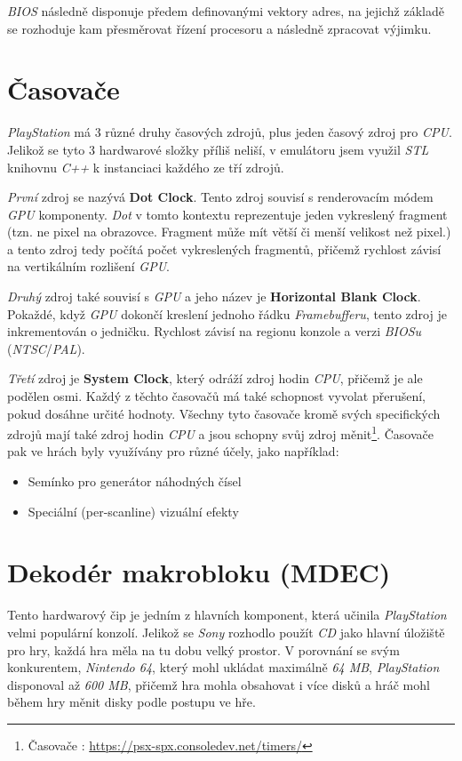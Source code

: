 \textit{BIOS} následně disponuje předem definovanými vektory adres, na jejichž základě se rozhoduje 
kam přesměrovat řízení procesoru a následně zpracovat výjimku.

\section{Časovače}

\textit{PlayStation} má 3 různé druhy časových zdrojů, plus jeden časový zdroj pro \textit{CPU}. 
Jelikož se tyto 3 hardwarové složky příliš neliší, v emulátoru jsem využil \textit{STL} knihovnu \textit{C++} k instanciaci každého ze tří zdrojů.

\textit{První} zdroj se nazývá \textbf{Dot Clock}. Tento zdroj souvisí s renderovacím módem \textit{GPU} komponenty. 
\textit{Dot} v tomto kontextu reprezentuje jeden vykreslený fragment (tzn. ne pixel na obrazovce. Fragment může mít větší či menší velikost než pixel.) a tento 
zdroj tedy počítá počet vykreslených fragmentů, přičemž rychlost závisí na vertikálním rozlišení \textit{GPU}.

\textit{Druhý} zdroj také souvisí s \textit{GPU} a jeho název je \textbf{Horizontal Blank Clock}. 
Pokaždé, když \textit{GPU} dokončí kreslení jednoho řádku \textit{Framebufferu}, tento zdroj je inkrementován o jedničku. 
Rychlost závisí na regionu konzole a verzi \textit{BIOSu} (\textit{NTSC}/\textit{PAL}).

\textit{Třetí} zdroj je \textbf{System Clock}, který odráží zdroj hodin \textit{CPU}, přičemž je ale podělen osmi.
Každý z těchto časovačů má také schopnost vyvolat přerušení, pokud dosáhne určité hodnoty. 
Všechny tyto časovače kromě svých specifických zdrojů mají také zdroj hodin \textit{CPU} a jsou schopny svůj zdroj měnit\footnote{Časovače \cite{PSXSpec}: \url{https://psx-spx.consoledev.net/timers/}}.
Časovače pak ve hrách byly využívány pro různé účely, jako například:

\begin{itemize}
    \item{Semínko pro generátor náhodných čísel}
    \item{Speciální (per-scanline) vizuální efekty}
\end{itemize}

\section{Dekodér makrobloku (MDEC)}

Tento hardwarový čip je jedním z hlavních komponent, která učinila \textit{PlayStation} velmi populární konzolí.
Jelikož se \textit{Sony} rozhodlo použít \textit{CD} jako hlavní úložiště pro hry, každá hra měla na tu dobu
velký prostor. V porovnání se svým konkurentem, \textit{Nintendo 64}, který mohl ukládat maximálně \textit{64 MB},
\textit{PlayStation} disponoval až \textit{600 MB}, přičemž hra mohla obsahovat i více disků a hráč mohl během hry
měnit disky podle postupu ve hře.

